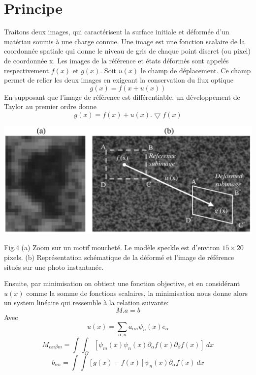 \documentclass{DGC_M2_report}
\begin{document}
\section{Principe}
Traitons deux images, qui caractérisent la surface initiale et déformée d'un
matériau soumis à une charge connue. Une image est une fonction scalaire de la coordonnée
spatiale qui donne le niveau de gris de chaque point discret (ou pixel) de coordonnée x. Les
images de la référence et états déformés sont appelés respectivement $f(x)$ et $g(x)$. Soit $u(x)$ le
champ de déplacement. Ce champ permet de relier les deux images en exigeant la conservation
du flux optique
\[g(x)=f(x+u(x))\]
En supposant que l'image de référence est différentiable, un développement de Taylor au premier
ordre donne
\[g(x)=f(x)+u(x).\bigtriangledown f(x)\]
\begin{center}
\includegraphics[scale=0.5]{Fig_4}
\end{center}
\begin{center}
\caption{Fig.4 (a) Zoom sur un motif moucheté. Le modèle speckle est d'environ $15\times 20$ pixels. (b) Représentation schématique de la déformé et l'image de référence situés sur une photo instantanée.}
\end{center}
Ensuite, par minimisation on obtient une fonction objective, et en considérant $u(x)$ comme
la somme de fonctions scalaires, la minimisation nous donne alors un system linéaire qui
ressemble à la relation suivante:
\[M.a=b\]
Avec
\[u(x)=\sum_{\alpha,n} a_{\alpha n}\psi_n(x)e_\alpha \]
\[M_{\alpha n \beta m}=\int{\int_{\Omega} {[\psi_m(x)\psi_n(x)\partial_\alpha f(x)\partial_\beta f(x)]\ dx}}\]
\[b_{\alpha n}=\int{\int{[g(x)-f(x)]\psi_n(x)\partial_\alpha f(x)\ dx}}\]
\end{document}
